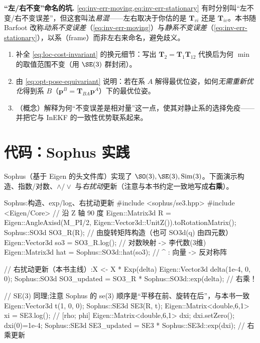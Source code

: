 \begin{note}
\textbf{“左/右不变”命名的坑.}\;
\cref{eq:inv-err-moving,eq:inv-err-stationary} 有时分别叫“左不变/右不变误差”，但这套叫法\emph{易混}——左右取决于你估的是 $\mathbf{T}_{vi}$ 还是 $\mathbf{T}_{iv}$。本书随 Barfoot\cite{barfoot2024state} 改称\emph{动系不变误差}（\cref{eq:inv-err-moving}）与\emph{静系不变误差}（\cref{eq:inv-err-stationary}），以系（frame）而非左右来命名，避免歧义。
\end{note}

\begin{practice}
\begin{enumerate}
  \item 补全 \cref{eq:loc-cost-invariant} 的换元细节：写出 $\mathbf{T}_2=\mathbf{T}_1\mathbf{T}_{12}$ 代换后为何 $\min$ 的取值范围不变（用 $\SE(3)$ 群封闭）。
  \item 由 \cref{eq:opt-pose-equivariant} 说明：若在系 $A$ 解得最优位姿，如何\emph{无需重新优化}得到系 $B$（$\mathbf{p}^B=\mathbf{T}_{BA}\mathbf{p}^A$）下的最优位姿。
  \item （概念）解释为何“不变误差是相对量”这一点，使其对静止系的选择免疫——并把它与 InEKF 的一致性优势联系起来。
\end{enumerate}
\end{practice}

\section{代码：Sophus 实践}
\label{sec:sophus}

Sophus（基于 Eigen 的头文件库）实现了 $\SO(3),\SE(3),\mathrm{Sim}(3)$。下面演示构造、指数/对数、$\wedge/\vee$ 与\emph{右扰动}更新（注意与本书约定一致地写成\textbf{右乘}）。

\begin{codebox}[C++]{Sophus:构造、exp/log、右扰动更新}
#include <sophus/se3.hpp>
#include <Eigen/Core>
// 沿 Z 轴 90 度
Eigen::Matrix3d R = Eigen::AngleAxisd(M_PI/2, Eigen::Vector3d::UnitZ()).toRotationMatrix();
Sophus::SO3d SO3_R(R);                 // 由旋转矩阵构造（也可 SO3d(q) 由四元数）
Eigen::Vector3d so3 = SO3_R.log();     // 对数映射 -> 李代数(3维)
Eigen::Matrix3d hat = Sophus::SO3d::hat(so3);   // ^ : 向量 -> 反对称阵

// 右扰动更新（本书主线）:X <- X * Exp(delta)
Eigen::Vector3d delta(1e-4, 0, 0);
Sophus::SO3d SO3_updated = SO3_R * Sophus::SO3d::exp(delta);   // 右乘！

// SE(3) 同理;注意 Sophus 的 se(3) 顺序是“平移在前、旋转在后”，与本书一致
Eigen::Vector3d t(1, 0, 0);
Sophus::SE3d SE3(R, t);
Eigen::Matrix<double,6,1> xi = SE3.log();        // [rho; phi]
Eigen::Matrix<double,6,1> dxi; dxi.setZero(); dxi(0)=1e-4;
Sophus::SE3d SE3_updated = SE3 * Sophus::SE3d::exp(dxi);       // 右乘更新
\end{codebox}

